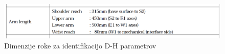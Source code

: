 \begin{figure}
  \includegraphics[width=\linewidth]{./Slike/arm_length.png}
  \caption{Dimenzije roke za identifikacijo D-H parametrov}
  \label{fig:pa10drawing}
\end{figure}